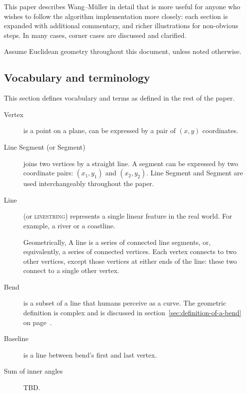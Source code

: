 \documentclass[a4paper]{article}
\newcommand{\onpage}[1]{\ref{#1} on page~\pageref{#1}}
\newcommand{\WM}{Wang--M{\"u}ller}
\begin{document}
This paper describes {\WM} in detail that is more useful for anyone who wishes
to follow the algorithm implementation more closely: each section is expanded
with additional commentary, and richer illustrations for non-obvious steps. In
many cases, corner cases are discussed and clarified.

Assume Euclidean geometry throughout this document, unless noted otherwise.

\subsection{Vocabulary and terminology}

This section defines vocabulary and terms as defined in the rest of the paper.

\begin{description}

    \item[Vertex] is a point on a plane, can be expressed by a pair of $(x,y)$
        coordinates.

    \item[Line Segment (or Segment)] joins two vertices by a straight line. A
        segment can be expressed by two coordinate pairs: $(x_1, y_1)$ and
        $(x_2, y_2)$. Line Segment and Segment are used interchangeably
        throughout the paper.

    \item[Line] (or \textsc{linestring}) represents a single linear feature in
        the real world. For example, a river or a coastline.

        Geometrically, A line is a series of connected line segments, or,
        equivalently, a series of connected vertices. Each vertex connects to
        two other vertices, except those vertices at either ends of the line:
        these two connect to a single other vertex.

    \item[Bend] is a subset of a line that humans perceive as a curve. The
        geometric definition is complex and is discussed in
        section~\onpage{sec:definition-of-a-bend}.

    \item[Baseline] is a line between bend's first and last vertex.

    \item[Sum of inner angles] TBD.

\end{description}
\end{document}

